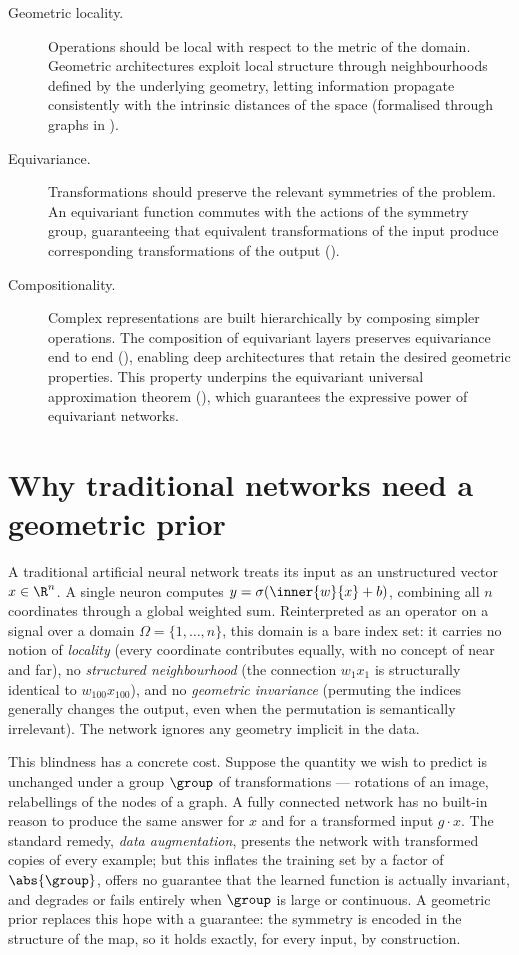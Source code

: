 \begin{description}
\item[Geometric locality.] Operations should be local with respect to the metric
of the domain. Geometric architectures exploit local structure through
neighbourhoods defined by the underlying geometry, letting information propagate
consistently with the intrinsic distances of the space (formalised through
graphs in ).
\item[Equivariance.] Transformations should preserve the relevant symmetries of
the problem. An equivariant function commutes with the actions of the symmetry
group, guaranteeing that equivalent transformations of the input produce
corresponding transformations of the output
().
\item[Compositionality.] Complex representations are built hierarchically by
composing simpler operations. The composition of equivariant layers preserves
equivariance end to end (), enabling deep
architectures that retain the desired geometric properties. This property
underpins the equivariant universal approximation theorem
(), which guarantees the expressive power of
equivariant networks.
\end{description}

\section{Why traditional networks need a geometric prior}
\label{sec:priors:motivation}

A traditional artificial neural network treats its input as an unstructured
vector $x \in \R^n$. A single neuron computes $y = \sigma(\inner{w}{x} + b)$,
combining all $n$ coordinates through a global weighted sum. Reinterpreted as an
operator on a signal over a domain $\Omega = \{1, \dots, n\}$, this domain is a
bare index set: it carries no notion of \emph{locality} (every coordinate
contributes equally, with no concept of near and far), no \emph{structured
neighbourhood} (the connection $w_1 x_1$ is structurally identical to
$w_{100} x_{100}$), and no \emph{geometric invariance} (permuting the indices
generally changes the output, even when the permutation is semantically
irrelevant). The network ignores any geometry implicit in the data.

This blindness has a concrete cost. Suppose the quantity we wish to predict is
unchanged under a group $\group$ of transformations --- rotations of an image,
relabellings of the nodes of a graph. A fully connected network has no built-in
reason to produce the same answer for $x$ and for a transformed input
$g \cdot x$. The standard remedy, \emph{data augmentation}, presents the network
with transformed copies of every example; but this inflates the training set by
a factor of $\abs{\group}$, offers no guarantee that the learned function is
actually invariant, and degrades or fails entirely when $\group$ is large or
continuous. A geometric prior replaces this hope with a guarantee: the symmetry
is encoded in the structure of the map, so it holds exactly, for every input,
by construction.

